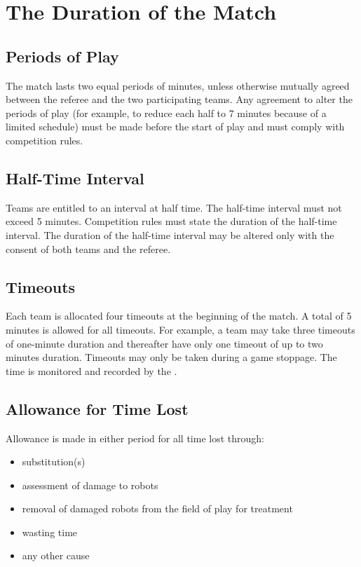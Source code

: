 \section{The Duration of the Match}\label{sec:duration-of-the-match}

\subsection{Periods of Play}
The match lasts two equal periods of   minutes, unless otherwise mutually agreed between the referee and the two participating teams.
Any agreement to alter the periods of play (for example, to reduce each half to 7 minutes because of a limited schedule) must be made before the start of play and must comply with competition rules.

\subsection{Half-Time Interval}
Teams are entitled to an interval at half time.
The half-time interval must not exceed 5 minutes.
Competition rules must state the duration of the half-time interval.
The duration of the half-time interval may be altered only with the consent of both teams and the referee.

\subsection{Timeouts}\label{subsec:duration-of-the-match-timeouts}
Each team is allocated four timeouts at the beginning of the match.
A total of 5 minutes is allowed for all timeouts.
For example, a team may take three timeouts of one-minute duration and thereafter have only one timeout of up to two minutes duration.
Timeouts may only be taken during a game stoppage.
The time is monitored and recorded by the .

\subsection{Allowance for Time Lost}
Allowance is made in either period for all time lost through:

\begin{itemize}
\item substitution(s)
\item assessment of damage to robots
\item removal of damaged robots from the field of play for treatment
\item wasting time
\item any other cause
\end{itemize}

